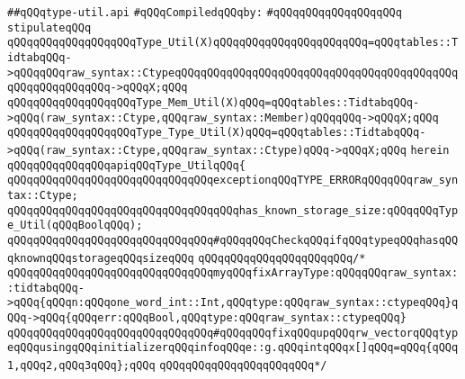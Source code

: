 \label{src/lib/c-kit/src/ast/type-util.api}
\verb|##qQQqtype-util.api|\newline
\newline
\verb|#qQQqCompiledqQQqby:|\newline
\verb|#qQQqqQQqqQQqqQQqqQQq|\newline
\newline
\verb|stipulateqQQq|\newline
\newline
\verb|qQQqqQQqqQQqqQQqqQQqType_Util(X)qQQqqQQqqQQqqQQqqQQqqQQq=qQQqtables::TidtabqQQq->qQQqqQQqraw_syntax::CtypeqQQqqQQqqQQqqQQqqQQqqQQqqQQqqQQqqQQqqQQqqQQqqQQqqQQqqQQqqQQq->qQQqX;qQQq|\newline
\verb|qQQqqQQqqQQqqQQqqQQqType_Mem_Util(X)qQQq=qQQqtables::TidtabqQQq->qQQq(raw_syntax::Ctype,qQQqraw_syntax::Member)qQQqqQQq->qQQqX;qQQq|\newline
\verb|qQQqqQQqqQQqqQQqqQQqType_Type_Util(X)qQQq=qQQqtables::TidtabqQQq->qQQq(raw_syntax::Ctype,qQQqraw_syntax::Ctype)qQQq->qQQqX;qQQq|\newline
\newline
\verb|herein|\newline
\newline
\verb|qQQqqQQqqQQqqQQqapiqQQqType_UtilqQQq{|\newline
\newline
\verb|qQQqqQQqqQQqqQQqqQQqqQQqqQQqqQQqexceptionqQQqTYPE_ERRORqQQqqQQqraw_syntax::Ctype;|\newline
\newline
\verb|qQQqqQQqqQQqqQQqqQQqqQQqqQQqqQQqqQQqhas_known_storage_size:qQQqqQQqType_Util(qQQqBoolqQQq);|\newline
\verb|qQQqqQQqqQQqqQQqqQQqqQQqqQQqqQQq#qQQqqQQqCheckqQQqifqQQqtypeqQQqhasqQQqknownqQQqstorageqQQqsizeqQQq|\newline
\newline
\verb|qQQqqQQqqQQqqQQqqQQqqQQq/*|\newline
\verb|qQQqqQQqqQQqqQQqqQQqqQQqqQQqqQQqmyqQQqfixArrayType:qQQqqQQqraw_syntax::tidtabqQQq->qQQq{qQQqn:qQQqone_word_int::Int,qQQqtype:qQQqraw_syntax::ctypeqQQq}qQQq->qQQq{qQQqerr:qQQqBool,qQQqtype:qQQqraw_syntax::ctypeqQQq}|\newline
\verb|qQQqqQQqqQQqqQQqqQQqqQQqqQQqqQQq#qQQqqQQqfixqQQqupqQQqrw_vectorqQQqtypeqQQqusingqQQqinitializerqQQqinfoqQQqe::g.qQQqintqQQqx[]qQQq=qQQq{qQQq1,qQQq2,qQQq3qQQq};qQQq|\newline
\verb|qQQqqQQqqQQqqQQqqQQqqQQq*/|\newline
